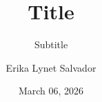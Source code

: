 \documentclass[aspectratio=169]{beamer}
\title{Title}
\subtitle{Subtitle}
\author{Erika Lynet Salvador}
\date{March 06, 2026}
\begin{document}
\begin{frame}
\titlepage
\end{frame}
\end{document}
